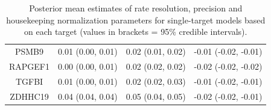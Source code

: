 \documentclass[../thesis.tex]{subfiles}
\begin{document}
\begin{table}[ht]
\begin{tabular}{cccc}
  PSMB9 & 0.01 (0.00, 0.01) & 0.02 (0.01, 0.02) & -0.01 (-0.02, -0.01) \\ 
  RAPGEF1 & 0.00 (0.00, 0.01) & 0.02 (0.02, 0.02) & -0.02 (-0.02, -0.02) \\ 
  TGFBI & 0.01 (0.00, 0.01) & 0.02 (0.02, 0.03) & -0.01 (-0.02, -0.01) \\ 
  ZDHHC19 & 0.04 (0.04, 0.04) & 0.05 (0.04, 0.05) & -0.02 (-0.02, -0.01) \\ 
   \hline
\end{tabular}
\caption{Posterior mean estimates of rate resolution, precision and housekeeping normalization parameters for single-target models based on each target (values in brackets = 95\% credible intervals). \label{tab:single_target_rate_models_summary}} 
\end{table}
\end{document}
